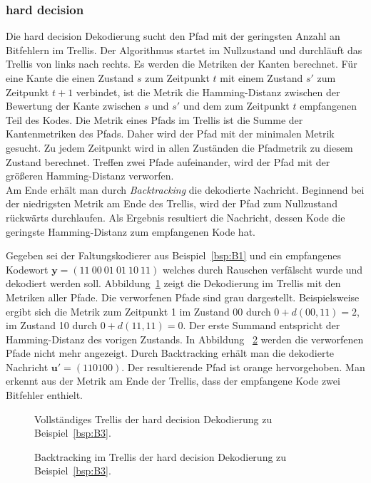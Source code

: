\subsubsection{hard decision}
\label{kapitel:grundlagen_hard_decision}
Die hard decision Dekodierung sucht den Pfad mit der geringsten Anzahl an Bitfehlern im Trellis. Der Algorithmus startet im Nullzustand und durchläuft das Trellis von links nach rechts. Es werden die Metriken der Kanten berechnet. Für eine Kante die einen Zustand $s$ zum Zeitpunkt $t$ mit einem Zustand $s'$ zum Zeitpunkt $t+1$ verbindet, ist die Metrik die Hamming-Distanz zwischen der Bewertung der Kante zwischen $s$ und $s'$ und dem zum Zeitpunkt $t$ empfangenen Teil des Kodes. Die Metrik eines Pfads im Trellis ist die Summe der Kantenmetriken des Pfads. Daher wird der Pfad mit der minimalen Metrik gesucht. Zu jedem Zeitpunkt wird in allen Zuständen die Pfadmetrik zu diesem Zustand berechnet. Treffen zwei Pfade aufeinander, wird der Pfad mit der größeren Hamming-Distanz verworfen.
\\
Am Ende erhält man durch \emph{Backtracking} die dekodierte Nachricht. Beginnend bei der niedrigsten Metrik am Ende des Trellis, wird der Pfad zum Nullzustand rückwärts durchlaufen. Als Ergebnis resultiert die Nachricht, dessen Kode die geringste Hamming-Distanz zum empfangenen Kode hat.
\begin{beispiel}
Gegeben sei der Faltungskodierer aus Beispiel~\ref{bsp:B1} und ein empfangenes Kodewort $\mathbf{y}=\left( 11~00~01~01~10~11\right)$ welches durch Rauschen verfälscht wurde und dekodiert werden soll. Abbildung~\ref{abb:trellis_dek_hard_a} zeigt die Dekodierung im Trellis mit den Metriken aller Pfade. Die verworfenen Pfade sind grau dargestellt. Beispielsweise ergibt sich die Metrik zum Zeitpunkt 1 im Zustand 00 durch $0+d(00,11)=2$, im Zustand 10 durch $0+d(11,11)=0$. Der erste Summand entspricht der Hamming-Distanz des vorigen Zustands. In Abbildung~ \ref{abb:trellis_dek_hard_b} werden die verworfenen Pfade nicht mehr angezeigt. Durch Backtracking erhält man die dekodierte Nachricht $\mathbf{u'}=\left( 110100\right)$. Der resultierende Pfad ist orange hervorgehoben. Man erkennt aus der Metrik am Ende der Trellis, dass der empfangene Kode zwei Bitfehler enthielt.
\label{bsp:B3}
\end{beispiel}

\begin{figure}[t]
	\centering
	\resizebox{0.75\textwidth}{!}{%
		
	}
	\caption{Vollständiges Trellis der hard decision Dekodierung zu Beispiel~\ref{bsp:B3}.}
	\label{abb:trellis_dek_hard_a}
\end{figure}
\begin{figure}[t]
	\centering
	\resizebox{0.75\textwidth}{!}{%
		
	}
	\caption{Backtracking im Trellis der hard decision Dekodierung zu Beispiel~\ref{bsp:B3}.}
	\label{abb:trellis_dek_hard_b}
\end{figure}

